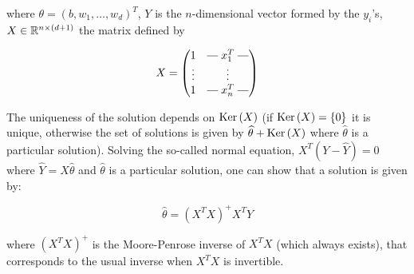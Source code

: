 \documentclass[a4paper, 11pt]{report}
\newcommand{\rotvert}{\rotatebox[origin=c]{90}{$\vert$}}
\begin{document}
where $\theta = \left( b, w_{1}, \dots, w_{d} \right)^{T}$, $Y$ is the $n$-dimensional vector formed by the $y_{i}$'s, $X \in \mathbb{R}^{n \times (d+1)}$ the matrix defined by
    
\begin{equation*}
    X = \begin{pmatrix} 
            1 & \protect\rotvert\; x_{1}^{T} \;\protect\rotvert \\
            \vdots & \vdots \\
            1 & \protect\rotvert\; x_{n}^{T} \;\protect\rotvert
        \end{pmatrix}
\end{equation*}
    
The uniqueness of the solution depends on $\operatorname{Ker} \left( X \right)$ (if $\operatorname{Ker} \left( X \right) = \left\{ 0 \right\}$ it is unique, otherwise the set of solutions is given by $\widehat{\theta} + \operatorname{Ker} \left( X \right)$ where $\widehat{\theta}$ is a particular solution). Solving the so-called normal equation, $X^{T} \left( Y - \widehat{Y} \right) = 0$ where $\widehat{Y} = X \widehat{\theta}$ and $\widehat{\theta}$ is a particular solution, one can show that a solution is given by:
    
\begin{equation*}
    \widehat{\theta} = \left( X^{T} X \right)^{+} X^{T} Y
\end{equation*}
    
where $\left( X^{T} X \right)^{+}$ is the Moore-Penrose inverse of $X^{T} X$ (which always exists), that corresponds to the usual inverse when $X^{T} X$ is invertible.
    
\end{document}
